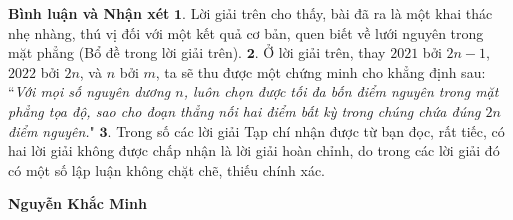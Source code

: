 \begin{multicols}{2}
	\vskip 0.05cm
	\textbf{\color{thachthuctoanhoc}Bình luận và Nhận xét}
	\vskip 0.05cm
	$\pmb{1.}$ Lời giải trên cho thấy, bài đã ra là một khai thác nhẹ nhàng, thú vị đối với một kết quả cơ bản, quen biết về lưới nguyên trong mặt phẳng (Bổ đề trong lời giải trên).
	\vskip 0.05cm
	$\pmb{2.}$ Ở lời giải trên, thay $2021$ bởi $2n - 1$, $2022$ bởi $2n$, và $n$ bởi $m$, ta sẽ thu được một chứng minh cho khẳng định sau:
	\vskip 0.05cm
	``\textit{Với mọi số nguyên dương $n$, luôn chọn được tối đa bốn điểm nguyên trong mặt phẳng tọa độ, sao cho đoạn thẳng nối hai điểm bất kỳ trong chúng chứa đúng $2n$ điểm nguyên.}"
	\vskip 0.05cm
	$\pmb{3.}$ Trong số các lời giải Tạp chí nhận được từ bạn đọc, rất tiếc, có hai lời giải không được chấp nhận là lời giải hoàn chỉnh, do trong các lời giải đó có một số lập luận không chặt chẽ, thiếu chính xác.
	\begin{flushright}
		\textbf{\color{thachthuctoanhoc}Nguyễn Khắc Minh}
	\end{flushright}
\end{multicols}

